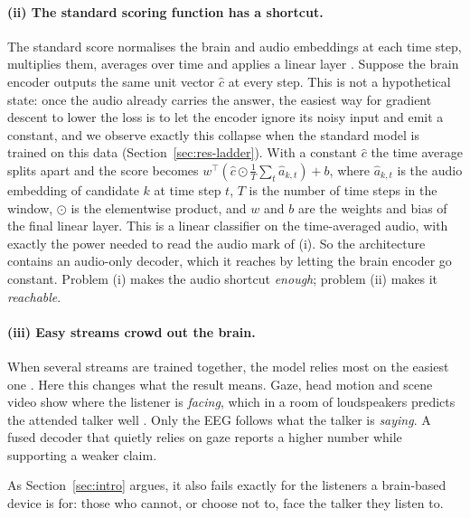\paragraph{(ii) The standard scoring function has a shortcut.}
\label{sec:degenerate}
The standard score normalises the brain and audio embeddings at each time step,
multiplies them, averages over time and applies a linear layer
\citep{accou2021,monesi2020}. Suppose the brain encoder outputs the same unit
vector $\hat c$ at every step. This is not a hypothetical state: once the audio
already carries the answer, the easiest way for gradient descent to lower the
loss is to let the encoder ignore its noisy input and emit a constant, and we
observe exactly this collapse when the standard model is trained on this data
(Section~\ref{sec:res-ladder}). With a constant $\hat c$ the time average splits
apart and the score becomes $w^\top(\hat c \odot \frac1T\sum_t \hat a_{k,t}) + b$,
where $\hat a_{k,t}$ is the audio embedding of candidate $k$ at time step $t$,
$T$ is the number of time steps in the window, $\odot$ is the elementwise
product, and $w$ and $b$ are the weights and bias of the final linear layer.
This is a linear classifier on the time-averaged audio, with exactly the power
needed to read the audio mark of (i). So the architecture contains an audio-only
decoder, which it reaches by letting the brain encoder go constant. Problem (i)
makes the audio shortcut \emph{enough}; problem (ii) makes it \emph{reachable}.

\paragraph{(iii) Easy streams crowd out the brain.}
\label{sec:freeload}
When several streams are trained together, the model relies most on the easiest
one \citep{wang2020gradblend,huang2022competition,wu2022greedy,peng2022ogm}.
Here this changes what the result means. Gaze, head motion and scene video show
where the listener is \emph{facing}, which in a room of loudspeakers predicts the
attended talker well \citep{kidd2005,rotaru2024}. Only the EEG follows what the
talker is \emph{saying}. A fused decoder that quietly relies on gaze reports a
higher number while supporting a weaker claim.

As Section~\ref{sec:intro} argues, it also fails exactly for the listeners a brain-based device
is for: those who cannot, or choose not to, face the talker they listen to.


